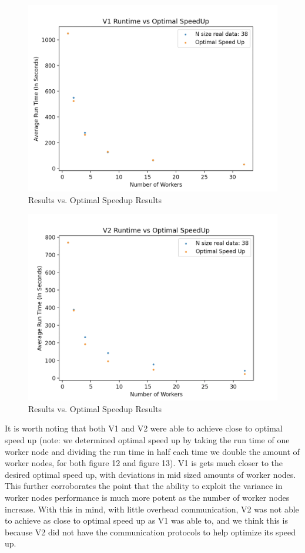 \documentclass[11pt,twocolumn]{article}
\begin{document}
\begin{figure}[!htb]
    \centering
    \includegraphics[scale = 0.2]{V1-speedup.png}
    \caption{Results vs. Optimal Speedup Results}
    \label{V1-speedup}
\end{figure}


\begin{figure}[!htb]
    \centering
    \includegraphics[scale = 0.2]{V2-speedup.png}
    \caption{Results vs. Optimal Speedup Results}
    \label{V2-speedup}
\end{figure}

\indent It is worth noting that both V1 and V2 were able to achieve close to optimal speed up (note: we determined optimal speed up by taking the run time of one worker node and dividing the run time in half each time we double the amount of worker nodes, for both figure 12 and figure 13). V1 is gets much closer to the desired optimal speed up, with deviations in mid sized amounts of worker nodes. This further corroborates the point that the ability to exploit the variance in worker nodes performance is much more potent as the number of worker nodes increase. With this in mind, with little overhead communication, V2 was not able to achieve as close to optimal speed up as V1 was able to, and we think this is because V2 did not have the communication protocols to help optimize its speed up.
\end{document}
